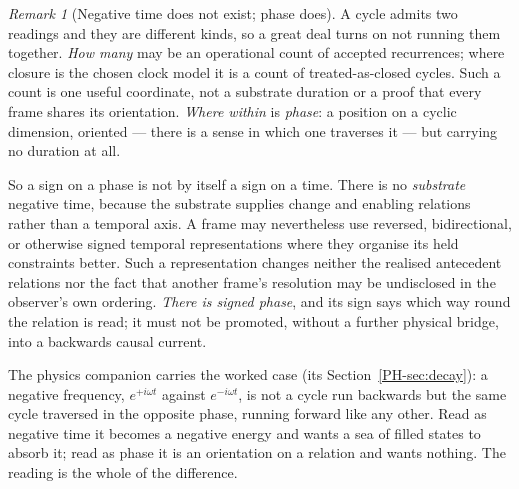 \documentclass[11pt,a4paper]{article}
\theoremstyle{remark}\newtheorem{remark}[definition]{Remark}
\begin{document}
\begin{remark}[Negative time does not exist; phase does]\label{rem:phase-not-time}
A cycle admits two readings and they are different kinds, so a great deal turns on not running them
together. \emph{How many} may be an operational count of accepted recurrences; where closure is the chosen
clock model it is a count of treated-as-closed cycles. Such a count is one useful coordinate, not a
substrate duration or a proof that every frame shares its orientation. \emph{Where within} is
\emph{phase}: a position on a cyclic dimension, oriented --- there is a sense in which one traverses
it --- but carrying no duration at all.

So a sign on a phase is not by itself a sign on a time. There is no \emph{substrate} negative time,
because the substrate supplies change and enabling relations rather than a temporal axis. A frame may
nevertheless use reversed, bidirectional, or otherwise signed temporal representations where they
organise its held constraints better. Such a representation changes neither the realised antecedent
relations nor the fact that another frame's resolution may be undisclosed in the observer's own
ordering. \emph{There is signed phase}, and its sign says which way round the relation is read; it
must not be promoted, without a further physical bridge, into a backwards causal current.

The physics companion carries the worked case (its Section~\ref{PH-sec:decay}): a negative frequency, $e^{+i\omega t}$ against
$e^{-i\omega t}$, is not a cycle run backwards but the same cycle traversed in the opposite phase,
running forward like any other. Read as negative time it becomes a negative energy and wants a sea of
filled states to absorb it; read as phase it is an orientation on a relation and wants nothing. The
reading is the whole of the difference.
\end{remark}
\end{document}
